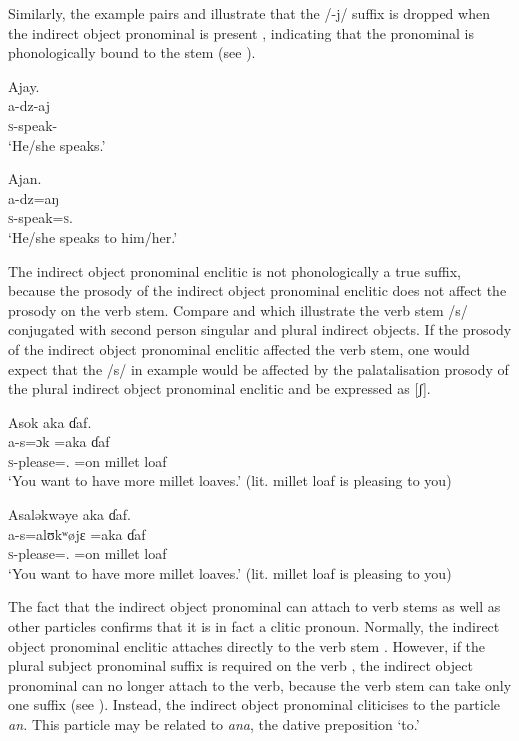 Similarly, the example pairs  and  illustrate that the /-j/ suffix is dropped when the indirect object pronominal is present , indicating that the pronominal is phonologically bound to the stem (see ). 

\ea\label{ex:7:20}
Ajay.\\
\gll a-dz-aj\\
\textsc{s}-speak{}-{\CL}\\
\glt ‘He/she speaks.’
\z

\ea\label{ex:7:21}
Ajan.\\
\gll a-dz=aŋ\\
\textsc{s}-speak=\textsc{s}.{\IO}\\
\glt ‘He/she speaks to him/her.’
\z

The indirect object pronominal enclitic is not phonologically a true suffix, because the prosody of the indirect object pronominal enclitic does not affect the prosody on the verb stem. Compare  and  which illustrate the verb stem /s/ conjugated with second person singular and plural indirect objects. If the prosody of the indirect object pronominal enclitic affected the verb stem, one would expect that the /s/ in example  would be affected by the palatalisation prosody of the plural indirect object pronominal enclitic and be expressed as [ʃ]. 

\ea\label{ex:7:22}
Asok  aka  ɗaf.\\
\gll a-s=ɔk    =aka  ɗaf\\
\textsc{s}-please={\twoS}.{\IO}  =on  {millet loaf}\\
\glt ‘You  want to have more millet loaves.’ (lit. millet loaf is pleasing to you)  
\z

\ea\label{ex:7:23}
Asaləkwəye  aka  ɗaf.\\
\gll a-s=alʊkʷøjɛ  =aka ɗaf\\
\textsc{s}-please={\twoP}.{\IO}  =on  {millet loaf}\\
\glt ‘You want to have more millet loaves.’ (lit. millet loaf is pleasing to you)  
\z

The fact that the indirect object pronominal can attach to verb stems as well as other particles confirms that it is in fact a clitic pronoun. Normally, the indirect object pronominal enclitic attaches directly to the verb stem .  However, if the plural subject pronominal suffix is required on the verb , the indirect object pronominal can no longer attach to the verb, because the verb stem can take only one suffix (see ). Instead, the indirect object pronominal cliticises to the particle \textit{an}\textit{.} This particle may be related to \textit{ana}, the dative preposition ‘to.’

